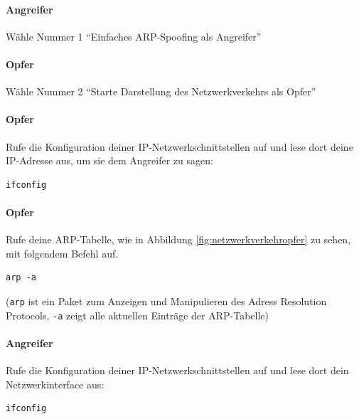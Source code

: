 \paragraph{Angreifer} Wähle Nummer 1 \enquote{Einfaches ARP-Spoofing als Angreifer}

\paragraph{Opfer} Wähle Nummer 2 \enquote{Starte Darstellung des Netzwerkverkehrs als Opfer}


\paragraph{Opfer} Rufe die Konfiguration deiner IP-Netzwerkschnittstellen auf und lese dort deine IP-Adresse aus, um sie dem Angreifer zu sagen:
\begin{lstlisting}
ifconfig
\end{lstlisting}

\paragraph{Opfer} Rufe deine ARP-Tabelle, wie in Abbildung \ref{fig:netzwerkverkehropfer} zu sehen, mit folgendem Befehl auf.
\begin{lstlisting}
arp -a
\end{lstlisting}
(\colorbox{altgray}{\lstinline|arp|} ist ein Paket zum Anzeigen und Manipulieren des Adress Resolution Protocols, \colorbox{altgray}{\lstinline|-a|} zeigt alle aktuellen Einträge der ARP-Tabelle)

\paragraph{Angreifer} Rufe die Konfiguration deiner IP-Netzwerkschnittstellen auf und lese dort dein Netzwerkinterface aus:
\begin{lstlisting}
ifconfig
\end{lstlisting}

